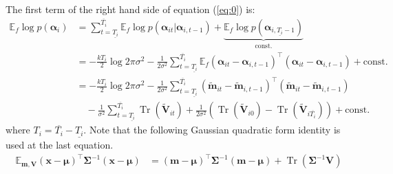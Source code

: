 \documentclass{article}
\DeclareMathOperator{\Tr}{Tr}
\begin{document}
The first term of the right hand side of equation (\ref{eq:0}) is:
\begin{align}
	\label{eq:1} \mathbb{E}_{f} \log p(\bm{\alpha}_i) &= \sum_{t=\underline{T_i}}^{\overline{T_i}} \mathbb{E}_{f} \log {p(\bm{\alpha}_{it}|\bm{\alpha}_{i,t-1})} + \underbrace{\mathbb{E}_{f} \log {p(\bm{\alpha}_{i,\underline{T_i}-1})}}_{\text{const.}} \\
	&= -\frac{kT_i}{2} \log 2\pi\sigma^2 - \frac{1}{2\sigma^2}\sum_{t=\underline{T_i}}^{\overline{T_i}} \mathbb{E}_{f} (\bm{\alpha}_{it}-\bm{\alpha}_{i,t-1})^\top(\bm{\alpha}_{it}-\bm{\alpha}_{i,t-1}) + \text{const.} \\
	&=   -\frac{kT_i}{2} \log 2\pi\sigma^2 - \frac{1}{2\sigma^2}\sum_{t=\underline{T_i}}^{\overline{T_i}} (\widetilde{\bm m}_{it}-\widetilde{\bm m}_{i,t-1})^\top(\widetilde{\bm m}_{it}-\widetilde{\bm m}_{i,t-1}) \\
	&\quad-\frac{1}{\sigma^2}\sum_{t=\underline{T_i}}^{\overline{T_i}} \Tr(\widetilde{\bm V}_{it}) + \frac{1}{2\sigma^2} \left( \Tr(\widetilde{\bm V}_{i0})  - \Tr(\widetilde{\bm V}_{i\overline{T_i}})\right) + \text{const.}
\end{align}
\noindent where $T_i = \overline{T_i}-\underline{T_i}$. Note that the following Gaussian quadratic form identity is used at the last equation.
\begin{align}
	\mathbb{E}_{\bm m,\bm V}(\bm x-\bm \mu)^\top \bm\Sigma^{-1} (\bm x-\bm \mu) &= (\bm m-\bm \mu)^\top\bm\Sigma^{-1} (\bm m-\bm \mu) + \Tr(\bm\Sigma^{-1}\bm V)
\end{align}
\end{document}
